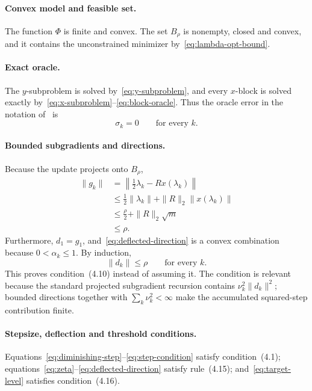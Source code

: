 \documentclass[12pt]{article}
\begin{document}
\paragraph{Convex model and feasible set.}
The function $\Phi$ is finite and convex.  The set $B_\rho$ is nonempty, closed and convex, and it contains the unconstrained minimizer by~\eqref{eq:lambda-opt-bound}.

\paragraph{Exact oracle.}
The $y$-subproblem is solved by~\eqref{eq:y-subproblem}, and every $x$-block is solved exactly by~\eqref{eq:x-subproblem}--\eqref{eq:block-oracle}.  Thus the oracle error in the notation of~\cite{dantoniofrangioni} is
\begin{equation}
\sigma_k=0\qquad\text{for every }k.
\label{eq:zero-oracle-error}
\end{equation}

\paragraph{Bounded subgradients and directions.}
Because the update projects onto $B_\rho$,
\begin{align}
\|g_k\|
&=\left\|\frac12\lambda_k-Rx(\lambda_k)\right\|\\
&\le\frac12\|\lambda_k\|+\|R\|_2\|x(\lambda_k)\|\\
&\le\frac\rho2+\|R\|_2\sqrt m\\
&\le\rho.
\end{align}
Furthermore, $d_1=g_1$, and~\eqref{eq:deflected-direction} is a convex combination because $0<\alpha_k\le1$.  By induction,
\begin{equation}
\|d_k\|\le\rho\qquad\text{for every }k.
\label{eq:bounded-directions}
\end{equation}
This proves condition~(4.10) instead of assuming it.  The condition is relevant because the standard projected subgradient recursion contains $\nu_k^2\|d_k\|^2$; bounded directions together with $\sum_k\nu_k^2<\infty$ make the accumulated squared-step contribution finite.

\paragraph{Stepsize, deflection and threshold conditions.}
Equations~\eqref{eq:diminishing-step}--\eqref{eq:step-condition} satisfy condition~(4.1); equations~\eqref{eq:zeta}--\eqref{eq:deflected-direction} satisfy rule~(4.15); and~\eqref{eq:target-level} satisfies condition~(4.16).
\end{document}
